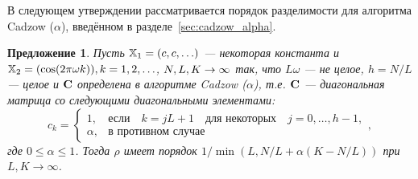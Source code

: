 \documentclass[12pt,a4paper,fleqn,leqno]{article}
\newtheorem{proposition}{Предложение}%
\begin{document}
В следующем утверждении рассматривается порядок разделимости для алгоритма Cadzow ($\alpha$), введённом в разделе~\ref{sec:cadzow_alpha}. 

\begin{proposition}
Пусть $\mathbb{X}_1 = (c, c, \ldots)$ --- некоторая константа и $\mathbb{X}_2 = (\cos(2 \pi \omega k)), k = 1, 2, \ldots$, $N,L,K\rightarrow \infty$ так, что $L\omega$ --- не целое, $h = N/L$ --- целое и $\mathbf{C}$ определена в алгоритме Cadzow ($\alpha$), т.е.  $\mathbf{C}$ --- диагональная матрица со следующими диагональными элементами:
\begin{equation*}
c_k = \begin{cases}
1, & \text{если} \quad k = jL+1 \quad \text{для некоторых} \quad j = 0, \ldots, h-1, \\
\alpha, & \text{в противном случае}
\end{cases},
\end{equation*}
где $0 \le \alpha \le 1$. Тогда $\rho$ имеет порядок $1/\min(L, N/L+\alpha(K - N/L))$ при $L, K \to \infty$.
\end{proposition}
\end{document}
